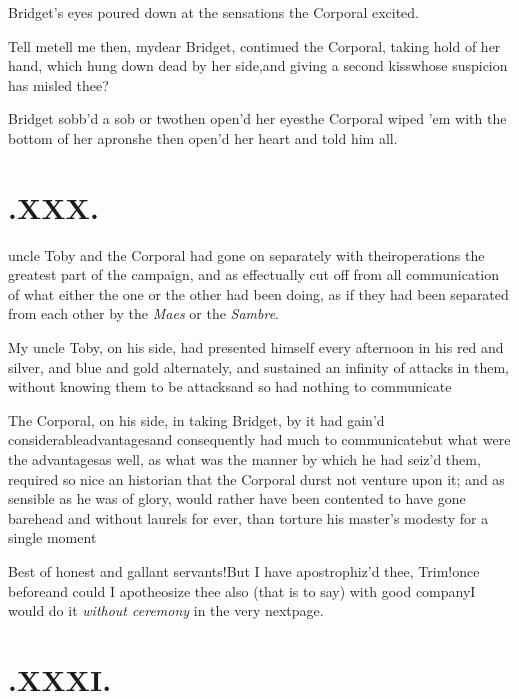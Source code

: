 \documentclass[twoside]{article}
\begin{document}
Bridget’s eyes poured down at the sensations the
Corporal excited.

\tsh Tell me\tsh tell me then, my\break dear
Bridget, continued the Corporal, taking hold of her hand,
which hung down dead by her side,\tsh and giving a second
kiss\tsh whose suspicion has misled thee?

Bridget sobb’d a sob or two\tsh then
open’d her eyes\tsh the Corporal wiped ’em
with the bottom of her apron\tsh\break she then open’d her
heart and told him all.

\vfill{}\eject

\section{\chapstrut{}.\enspace XXX.}

 uncle Toby and the Corporal
had gone on separately with their\break operations the greatest part of
the campaign, and as effectually cut off from all communication of
what either the one or the other had been doing, as if they had
been separated from each other by the \textit{Maes} or the
\textit{Sambre}.

My uncle Toby, on his side, had presented himself every
afternoon in his red and silver, and blue and gold alternately, and
sustained an infinity of attacks in them, without knowing them to
be attacks\tsk and so had nothing to
communicate\tsh{}

The Corporal, on his side, in taking Bridget, by it had
gain’d considerable\break advantages\tsk\tsk and consequently
had much to communicate\tsh but what were the
advantages\tsh as well, as what was the manner by which he
had seiz’d them, required so nice an historian that the
Corporal durst not venture upon it; and as sensible as he was of
glory, would rather have been contented to have gone barehead and
without laurels for ever, than torture his master’s modesty\break
for a single moment\tsh

\tsh Best of honest and gallant
servants!\tsh But I have apostrophiz’d thee,
Trim!\@ once before\tsh and could I apotheosize thee
also (that is to say) with good company\tsh I would do it
\textit{without ceremony} in the very next\break page.

\vfill{}\eject
\null
\section{.\enspace XXXI.}
\end{document}
